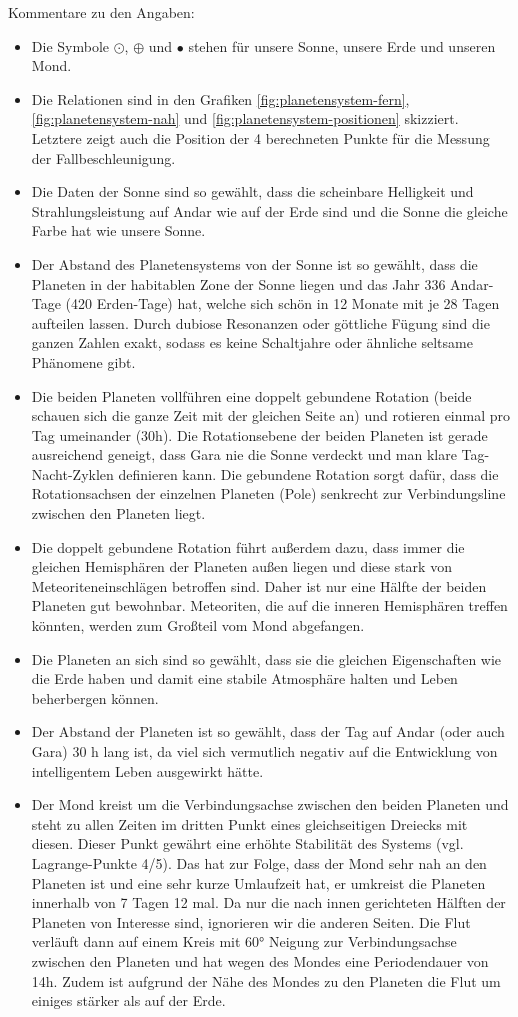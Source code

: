 Kommentare zu den Angaben:
\begin{itemize}
	\item Die Symbole $\odot$, $\oplus$ und $\bullet$ stehen für unsere Sonne, unsere Erde und unseren Mond.
	\item Die Relationen sind in den Grafiken \ref{fig:planetensystem-fern}, \ref{fig:planetensystem-nah} und \ref{fig:planetensystem-positionen} skizziert. Letztere zeigt auch die Position der 4 berechneten Punkte für die Messung der Fallbeschleunigung.
	\item Die Daten der Sonne sind so gewählt, dass die scheinbare Helligkeit und Strahlungsleistung auf Andar wie auf der Erde sind und die Sonne die gleiche Farbe hat wie unsere Sonne.
	\item Der Abstand des Planetensystems von der Sonne ist so gewählt, dass die Planeten in der habitablen Zone der Sonne liegen und das Jahr 336 Andar-Tage (420 Erden-Tage) hat, welche sich schön in 12 Monate mit je 28 Tagen aufteilen lassen. Durch dubiose Resonanzen oder göttliche Fügung sind die ganzen Zahlen exakt, sodass es keine Schaltjahre oder ähnliche seltsame Phänomene gibt.
	\item Die beiden Planeten vollführen eine doppelt gebundene Rotation (beide schauen sich die ganze Zeit mit der gleichen Seite an) und rotieren einmal pro Tag umeinander (30h). Die Rotationsebene der beiden Planeten ist gerade ausreichend geneigt, dass Gara nie die Sonne verdeckt und man klare Tag-Nacht-Zyklen definieren kann. Die gebundene Rotation sorgt dafür, dass die Rotationsachsen der einzelnen Planeten (Pole) senkrecht zur Verbindungsline zwischen den Planeten liegt.
	\item Die doppelt gebundene Rotation führt außerdem dazu, dass immer die gleichen Hemisphären der Planeten außen liegen und diese stark von Meteoriteneinschlägen betroffen sind. Daher ist nur eine Hälfte der beiden Planeten gut bewohnbar. Meteoriten, die auf die inneren Hemisphären treffen könnten, werden zum Großteil vom Mond abgefangen.
	\item Die Planeten an sich sind so gewählt, dass sie die gleichen Eigenschaften wie die Erde haben und damit eine stabile Atmosphäre halten und Leben beherbergen können.
	\item Der Abstand der Planeten ist so gewählt, dass der Tag auf Andar (oder auch Gara) 30 h lang ist, da viel sich vermutlich negativ auf die Entwicklung von intelligentem Leben ausgewirkt hätte.
	\item Der Mond kreist um die Verbindungsachse zwischen den beiden Planeten und steht zu allen Zeiten im dritten Punkt eines gleichseitigen Dreiecks mit diesen. Dieser Punkt gewährt eine erhöhte Stabilität des Systems (vgl. Lagrange-Punkte 4/5). Das hat zur Folge, dass der Mond sehr nah an den Planeten ist und eine sehr kurze Umlaufzeit hat, er umkreist die Planeten innerhalb von 7 Tagen 12 mal. Da nur die nach innen gerichteten Hälften der Planeten von Interesse sind, ignorieren wir die anderen Seiten. Die Flut verläuft dann auf einem Kreis mit 60° Neigung zur Verbindungsachse zwischen den Planeten und hat wegen des Mondes eine Periodendauer von 14h. Zudem ist aufgrund der Nähe des Mondes zu den Planeten die Flut um einiges stärker als auf der Erde.

\end{itemize}
